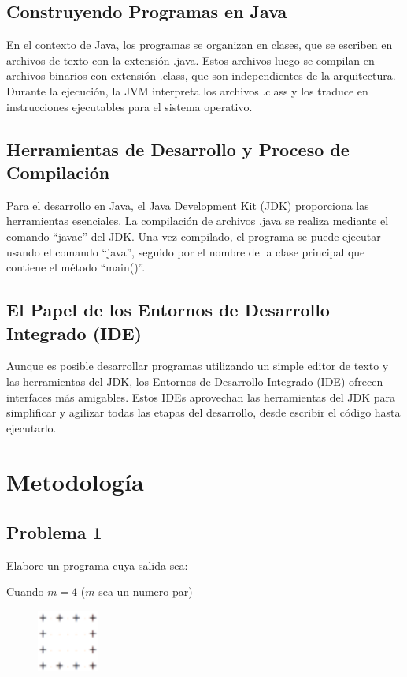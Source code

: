 \documentclass[12pt]{article}
\begin{document}
    \subsection*{Construyendo Programas en Java}
    En el contexto de Java, los programas se organizan en clases, que se escriben en archivos de texto con la extensión .java. Estos archivos luego se compilan en archivos binarios con extensión .class, que son independientes de la arquitectura. Durante la ejecución, la JVM interpreta los archivos .class y los traduce en instrucciones ejecutables para el sistema operativo.

    \subsection*{Herramientas de Desarrollo y Proceso de Compilación}
    Para el desarrollo en Java, el Java Development Kit (JDK) proporciona las herramientas esenciales. La compilación de archivos .java se realiza mediante el comando ``javac'' del JDK. Una vez compilado, el programa se puede ejecutar usando el comando ``java'', seguido por el nombre de la clase principal que contiene el método ``main()''.

    \subsection*{El Papel de los Entornos de Desarrollo Integrado (IDE)}
    Aunque es posible desarrollar programas utilizando un simple editor de texto y las herramientas del JDK, los Entornos de Desarrollo Integrado (IDE) ofrecen interfaces más amigables. Estos IDEs aprovechan las herramientas del JDK para simplificar y agilizar todas las etapas del desarrollo, desde escribir el código hasta ejecutarlo.
    
    \section*{Metodología} 

    \subsection*{Problema 1}
    Elabore un programa cuya salida sea:

    Cuando $m = 4$ ($m$ sea un numero par)
    \begin{figure}[h]
        \includegraphics[width=2cm]{Cuadrado1.png}
    \end{figure}
\end{document}
